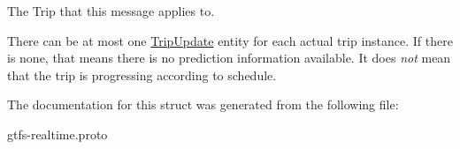 The Trip that this message applies to. 

There can be at most one \hyperlink{structTripUpdate}{Trip\+Update} entity for each actual trip instance. If there is none, that means there is no prediction information available. It does {\itshape not} mean that the trip is progressing according to schedule. 

The documentation for this struct was generated from the following file\+:\begin{DoxyCompactItemize}
\item 
gtfs-\/realtime.\+proto\end{DoxyCompactItemize}
